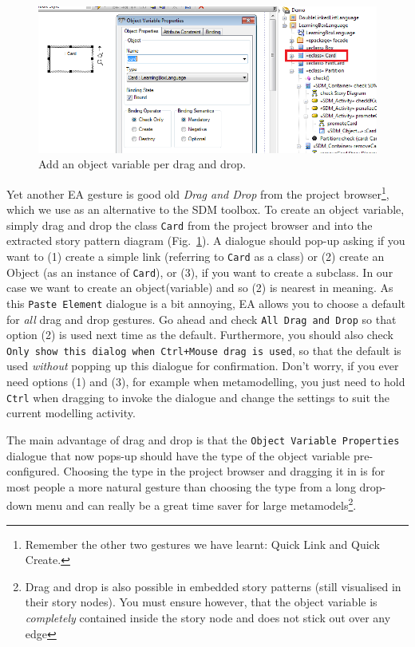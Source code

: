 \begin{figure}[htbp]
\begin{center}
  \includegraphics[width=\textwidth]{pics/sdmBilder/check/sdm22RAW}
  \caption{Add an object variable per drag and drop.}  
  \label{fig:sdm_check_bound_card}
\end{center}
\end{figure}

Yet another EA gesture is good old \emph{Drag and Drop} from the project
browser\footnote{Remember the other two gestures we have learnt:  Quick Link
and Quick Create.}, which we use as an alternative to the SDM toolbox.  
To create an object variable, simply drag and drop the class
\texttt{Card} from the project browser and into the extracted story
pattern diagram (Fig.~\ref{fig:sdm_check_bound_card}).  A dialogue should pop-up
asking if you want to (1) create a simple link (referring to \texttt{Card} as a
class) or (2) create an Object (as an instance of \texttt{Card}), or (3), if you
want to create a subclass.  In our case we want to create an object(variable) 
and so (2) is nearest in meaning.  As this \texttt{Paste Element} dialogue is a
bit annoying, EA  allows you to choose a default for \emph{all} drag and drop
gestures.  Go ahead and check \texttt{All Drag and Drop} so that option (2) is
used next time as the default.  Furthermore, you should also check 
\texttt{Only show this dialog when Ctrl+Mouse drag is used}, so that the 
default is used \emph{without} popping up this dialogue for confirmation. Don't worry,
if you ever need options (1) and (3), for example when metamodelling, you  just
need to hold \texttt{Ctrl} when dragging to invoke the dialogue and change  the
settings to suit the current modelling activity. 

The main advantage of drag and drop is that the \texttt{Object Variable
Pro\-per\-ties} dialogue that now pops-up should have the type of the object
variable pre-configured. Choosing the type in the project browser and dragging it in
is for most people a more natural gesture than choosing the type from a long
drop-down menu and can really be a great time saver for large
metamodels\footnote{Drag and drop is also possible in embedded story patterns
(still visualised in their story nodes).  You must ensure however, that the
object variable is \emph{completely} contained inside the story node and does
not stick out over any edge}. 

